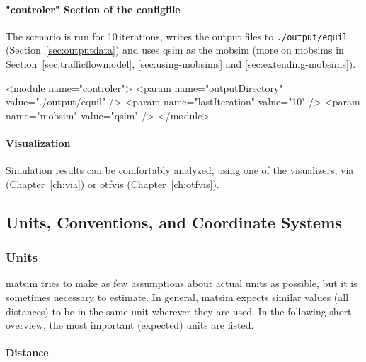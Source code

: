 \paragraph{"controler" Section of the \protect\gls{configfile}}

The scenario is run for 10\,iterations, writes the output files to \lstinline|./output/equil| (Section~\ref{sec:outputdata}) and uses \gls{qsim} as the \gls{mobsim} (more on \glspl{mobsim} in Section~\ref{sec:trafficflowmodel}, \ref{sec:using-mobsims} and \ref{sec:extending-mobsims}).
\begin{xml}
<module name="controler">
   <param name="outputDirectory" value="./output/equil" />
   <param name="lastIteration" value="10" />
   <param name="mobsim" value="qsim" />	
</module>
\end{xml}


\paragraph{Visualization}

Simulation results can be comfortably analyzed, using one of the visualizers, \gls{via} (Chapter~\ref{ch:via}) or \gls{otfvis} (Chapter~\ref{ch:otfvis}).

\subsection{Units, Conventions, and Coordinate Systems}
\label{sec:unitsconventions}
\subsubsection{Units}
\gls{matsim} tries to make as few assumptions about actual units as possible, but it is sometimes necessary to estimate. In general, \gls{matsim} expects similar values (\eg all distances) to be in the same unit wherever they are used. In the following short overview, the most important (expected) units are listed.

\paragraph{Distance}

